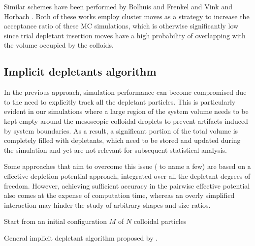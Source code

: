 Similar schemes have been performed by Bolhuis and Frenkel \cite{Bolhuis1994} and Vink and Horbach \cite{Vink2004}. Both of these works employ cluster moves as a strategy to increase the acceptance ratio of these MC simulations, which is otherwise significantly low since trial depletant insertion moves have a high probability of overlapping with the volume occupied by the colloids.

\subsection{Implicit depletants algorithm}
\label{sec:implicit}

In the previous approach, simulation performance can become compromised due to the need to explicitly track all the depletant particles. This is particularly evident in our simulations where a large region of the system volume needs to be kept empty around the mesoscopic colloidal droplets to prevent artifacts induced by system boundaries. As a result, a significant portion of the total volume is completely filled with depletants, which need to be stored and updated during the simulation and yet are not relevant for subsequent statistical analysis.

Some approaches that aim to overcome this issue (\cite{bolhuis_jcp1997,PhysRevE.73.041404,Henzie2011} to name a few) are based on a effective depletion potential approach, integrated over all the depletant degrees of freedom. However, achieving sufficient accuracy in the pairwise effective potential also comes at the expense of computation time, whereas an overly simplified interaction may hinder the study of arbitrary shapes and size ratios.


\begin{algorithm}[h]
    \SetAlgoLined

    Start from an initial configuration $M$ of $N$ colloidal particles\;
    \caption{General implicit depletant algorithm proposed by \cite{glaser2015parallel}.}
    \label{algo:implicit}
\end{algorithm}

